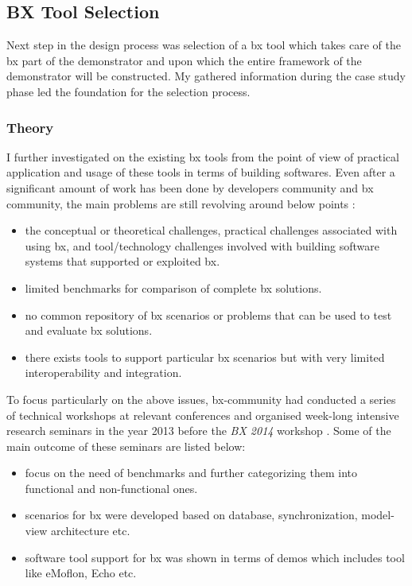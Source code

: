 \subsection{BX Tool Selection}\label{subsec:bxtoolselection}
Next step in the design process was selection of a bx tool which takes care of the bx part of the demonstrator and upon which the entire framework of the demonstrator will be constructed. My gathered information during the case study phase led the foundation for the selection process.
\subsubsection{Theory}\label{subsubsec:bxtooltheory}
I further investigated on the existing bx tools from the point of view of practical application and usage of these tools in terms of building softwares. Even after a significant amount of work has been done by developers community and bx community, the main problems are still revolving around below points \cite{bx-theoryandappl}: 
\begin{itemize}
	\item {the conceptual or theoretical challenges, practical challenges associated with using bx, and tool/technology challenges involved with building software systems that supported or exploited bx.}
	\item {limited benchmarks for comparison of complete bx solutions.}
	\item {no common repository of bx scenarios or problems that can be used to test and evaluate bx solutions.}
	\item {there exists tools to support particular bx scenarios but with very limited interoperability and integration.}
\end{itemize}
To focus particularly on the above issues, bx-community had conducted a series of technical workshops at relevant conferences and organised week-long intensive research seminars in the year 2013 before the \textit{BX 2014} workshop \cite{bx-theoryandappl}. Some of the main outcome of these seminars are listed below:
\begin{itemize}
	\item {focus on the need of benchmarks and further categorizing them into functional and non-functional ones.}
	\item {scenarios for bx were developed based on database, synchronization, model-view architecture etc.}
	\item {software tool support for bx was shown in terms of demos which includes tool like eMoflon, Echo etc.}
\end{itemize}
